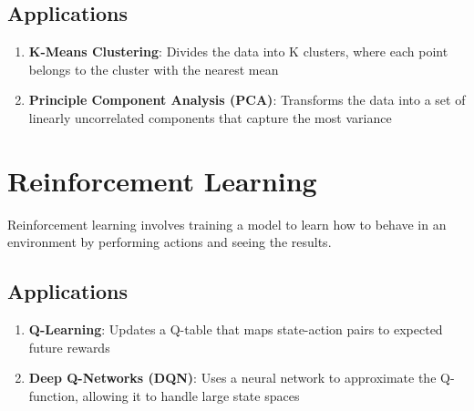 \documentclass{article}
\begin{document}
\subsection*{Applications}

\begin{enumerate}
    \item \textbf{K-Means Clustering}: Divides the data into K clusters, where each point belongs to the cluster with the nearest mean
    \item \textbf{Principle Component Analysis (PCA)}: Transforms the data into a set of linearly uncorrelated components that capture the most variance
\end{enumerate}

\section*{Reinforcement Learning}

Reinforcement learning involves training a model to learn how to behave in an environment by performing actions and seeing the results.

\subsection*{Applications}

\begin{enumerate}
    \item \textbf{Q-Learning}: Updates a Q-table that maps state-action pairs to expected future rewards
    \item \textbf{Deep Q-Networks (DQN)}: Uses a neural network to approximate the Q-function, allowing it to handle large state spaces
\end{enumerate}
\end{document}
